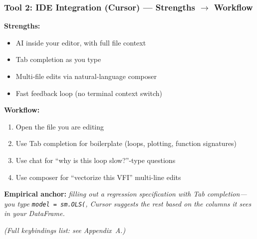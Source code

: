 \documentclass[10pt,english,aspectratio=169]{beamer}
\begin{document}
\begin{frame}
\frametitle{Tool 2: IDE Integration (Cursor) --- Strengths $\to$ Workflow}

\textbf{Strengths:}
\begin{itemize}
    \item AI inside your editor, with full file context
    \item Tab completion as you type
    \item Multi-file edits via natural-language composer
    \item Fast feedback loop (no terminal context switch)
\end{itemize}

\vspace{0.2cm}

\textbf{Workflow:}
\begin{enumerate}
    \item Open the file you are editing
    \item Use Tab completion for boilerplate (loops, plotting, function signatures)
    \item Use chat for ``why is this loop slow?''-type questions
    \item Use composer for ``vectorize this VFI'' multi-line edits
\end{enumerate}

\vspace{0.2cm}

\textbf{Empirical anchor:} \textit{filling out a regression specification with Tab completion---you type \texttt{model = sm.OLS(}, Cursor suggests the rest based on the columns it sees in your DataFrame.}

\vspace{0.1cm}

\textit{(Full keybindings list: see Appendix~A.)}
\end{frame}
\end{document}
